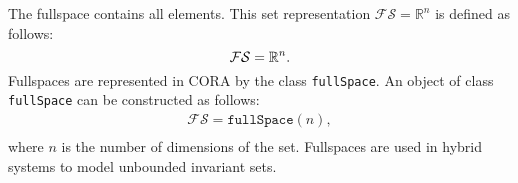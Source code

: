  \label{sec:fullspace}

The fullspace contains all elements.
This set representation $\mathcal{FS} = \mathbb{R}^n$ is defined as follows:
\begin{equation}
	\mathcal{FS} = \mathbb{R}^{n}.
	\label{eq:defFullspace}
\end{equation}
Fullspaces are represented in CORA by the class \texttt{fullSpace}.
An object of class \texttt{fullSpace} can be constructed as follows:
\begin{equation*}
	\begin{split}
		\mathcal{FS} = \texttt{fullSpace}(n), \\
	\end{split}
\end{equation*}
where $n$ is the number of dimensions of the set.
Fullspaces are used in hybrid systems to model unbounded invariant sets.




